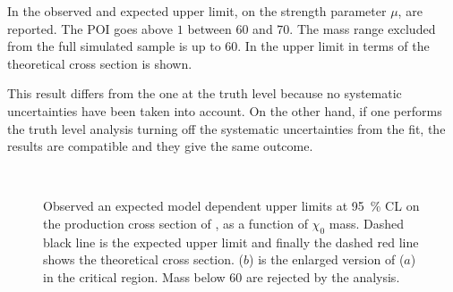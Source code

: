 In \Tab{\ref{tab:mu}} the observed and expected upper limit, on the strength parameter $\mu$, are reported. The POI goes above $1$ between \SI{60}{\gev} and \SI{70}{\gev}. The mass range excluded from the full simulated sample is up to \SI{60}{\gev}. In \Fig{\ref{fig:exclMD}} the upper limit in terms of the theoretical cross section is shown. 

This result differs from the one at the truth level because no systematic uncertainties have been taken into account. On the other hand, if one performs the truth level analysis turning off the systematic uncertainties from the fit, the results are compatible and they give the same outcome.



\begin{figure}[tp]
\centering
{} \\
 \quad
\caption{Observed an expected model dependent upper limits at \SI{95}{\percent} CL on the production cross section of \chizero, as a function of $\chi_0$ mass. Dashed black line is the expected upper limit and finally the dashed red line shows the  theoretical cross section. ($b$) is the enlarged version of ($a$) in the critical region. Mass below \SI{60}{\gev} are rejected by the analysis.}
\label{fig:exclMD}
\end{figure}











